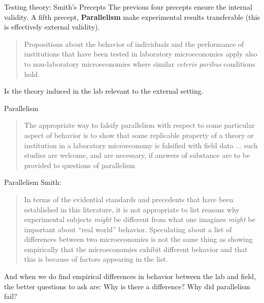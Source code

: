 \documentclass{beamer}
\begin{document}
\begin{frame}{Testing theory: Smith's Precepts}
The previous four precepts ensure the internal validity.
A fifth precept, \textbf{Parallelism} make experimental results transferable (this is effectively external validity).

\begin{quotation}
	Propositions about the behavior of individuals and the performance of institutions that have been tested in laboratory microeconomies apply also to non-laboratory microeconomies where similar \emph{ceteris paribus} conditions hold.
\end{quotation}

\pause

Is the theory induced in the lab relevant to the external setting.
\end{frame}

\begin{frame}{Parallelism}

\begin{quotation}
	The appropriate way to falsify parallelism with respect to some particular aspect of behavior is to show that some replicable property of a theory or institution in a laboratory microeconomy is falsified with field data ... such studies are welcome, and are necessary, if answers of substance are to be provided to questions of parallelism
\end{quotation}

\end{frame}

\begin{frame}{Parallelism}
Smith:
\begin{quotation}
	In terms of the evidential standards and precedents that have been established in this literature, it is not appropriate to list reasons why experimental subjects \emph{might} be different from what one imagines \emph{might} be important about ``real world'' behavior. Speculating about a list of differences between two microeconomies is not the same thing as showing empirically that the microeconomies exhibit different behavior and that this is because of factors appearing in the list.
\end{quotation}

And when we do find empirical differences in behavior between the lab and field, the better questions to ask are: Why is there a difference? Why did parallelism fail?

\end{frame}
\end{document}

